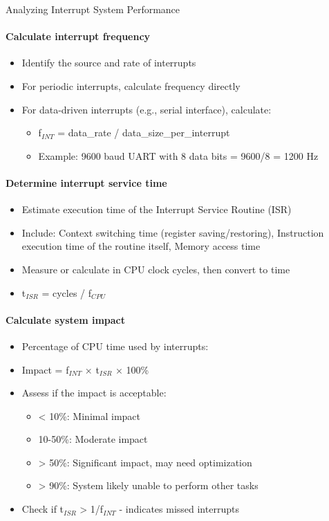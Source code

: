 \multend

\begin{KR}{Analyzing Interrupt System Performance}
\paragraph{Calculate interrupt frequency}
\begin{itemize}
    \item Identify the source and rate of interrupts
    \item For periodic interrupts, calculate frequency directly
    \item For data-driven interrupts (e.g., serial interface), calculate:
    \begin{itemize}
        \item f$_{INT}$ = data\_rate / data\_size\_per\_interrupt
        \item Example: 9600 baud UART with 8 data bits = 9600/8 = 1200 Hz
    \end{itemize}
\end{itemize}

\paragraph{Determine interrupt service time}
\begin{itemize}
    \item Estimate execution time of the Interrupt Service Routine (ISR)
    \item Include: Context switching time (register saving/restoring), Instruction execution time of the routine itself, Memory access time
    \item Measure or calculate in CPU clock cycles, then convert to time
    \item t$_{ISR}$ = cycles / f$_{CPU}$
\end{itemize}

\paragraph{Calculate system impact}
\begin{itemize}
    \item Percentage of CPU time used by interrupts:
    \item Impact = f$_{INT}$ × t$_{ISR}$ × 100\%
    \item Assess if the impact is acceptable:
    \begin{itemize}
        \item < 10\%: Minimal impact
        \item 10-50\%: Moderate impact
        \item > 50\%: Significant impact, may need optimization
        \item > 90\%: System likely unable to perform other tasks
    \end{itemize}
    \item Check if t$_{ISR}$ > 1/f$_{INT}$ - indicates missed interrupts
\end{itemize}
\end{KR}

